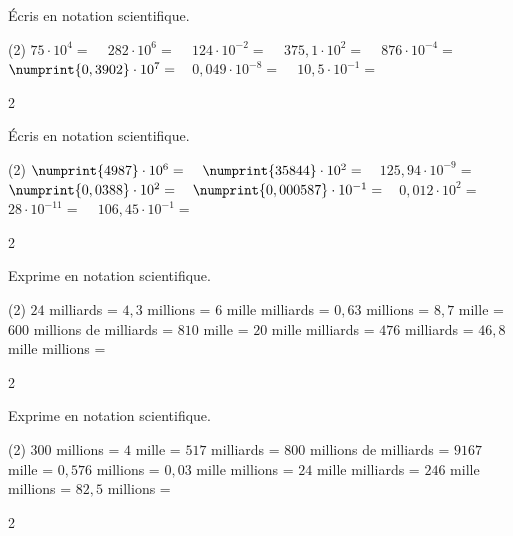 \documentclass[a4paper,11pt]{report}
\begin{document}
\begin{exop}{
    Écris en notation scientifique. 

    \begin{tasks}(2)
        \task $75\cdot10^4=$ \hrulefill~
        \task $282\cdot10^6=$ \hrulefill~
        \task $124\cdot10^{-2}=$ \hrulefill~
        \task $375,1\cdot10^2=$ \hrulefill~
        \task $876\cdot10^{-4}=$ \hrulefill~
        \task $\numprint{0,3902}\cdot10^7=$ \hrulefill~
        \task $0,049\cdot10^{-8}=$ \hrulefill~
        \task $10,5\cdot10^{-1}=$ \hrulefill~
    \end{tasks}
}{2}    
\end{exop}

\begin{exop}{
    Écris en notation scientifique. 

    \begin{tasks}(2)
        \task $\numprint{4987}\cdot10^6=$ \hrulefill~
        \task $\numprint{35844}\cdot10^2=$ \hrulefill~
        \task $125,94\cdot10^{-9}=$ \hrulefill~
        \task $\numprint{0,0388}\cdot10^2=$ \hrulefill~
        \task $\numprint{0,000587}\cdot10^{-1}=$ \hrulefill~
        \task $0,012\cdot10^2=$ \hrulefill~
        \task $28\cdot10^{-11}=$ \hrulefill~
        \task $106,45\cdot10^{-1}=$ \hrulefill~
    \end{tasks}
}{2}    
\end{exop}

\begin{exo}{
    Exprime en notation scientifique.

    \begin{tasks}(2)
        \task $24$ milliards =
        \task $4,3$ millions =
        \task $6$ mille milliards =
        \task $0,63$ millions =
        \task $8,7$ mille =
        \task $600$ millions de milliards =
        \task $810$ mille =
        \task $20$ mille milliards =
        \task $476$ milliards =
        \task $46,8$ mille millions =
    \end{tasks}
}{2}
\end{exo}

\begin{exo}{
    Exprime en notation scientifique.

    \begin{tasks}(2)
        \task $300$ millions =
        \task $4$ mille =
        \task $517$ milliards =
        \task $800$ millions de milliards =
        \task $9167$ mille =
        \task $0,576$ millions =
        \task $0,03$ mille millions =
        \task $24$ mille milliards =
        \task $246$ mille millions =
        \task $82,5$ millions =
    \end{tasks}
}{2}
\end{exo}
\end{document}
